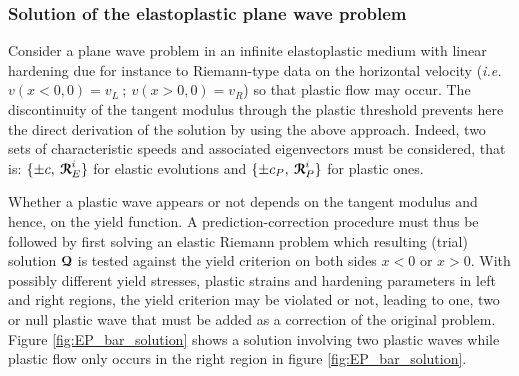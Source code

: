 \subsubsection{Solution of the elastoplastic plane wave problem}
Consider a plane wave problem in an infinite elastoplastic medium with linear hardening due for instance to Riemann-type data on the horizontal velocity (\textit{i.e. }$v(x<0,0)=v_L\:;\:v(x>0,0)=v_R$) so that plastic flow may occur.
The discontinuity of the tangent modulus through the plastic threshold prevents here the direct derivation of the solution by using the above approach. Indeed, two sets of characteristic speeds and associated eigenvectors must be considered, that is: $\{\pm c , \: {\boldsymbol{\mathcal{R}}}^i_E\}$ for elastic evolutions and $\{\pm c_P, \: {\boldsymbol{\mathcal{R}}}^i_P\}$ for plastic ones.

Whether a plastic wave appears or not depends on the tangent modulus and hence, on the yield function. A prediction-correction procedure must thus be followed by first solving an elastic Riemann problem which resulting (trial) solution ${\boldsymbol{\mathcal{Q}}}$ is tested against the yield criterion on both sides $x<0$ or $x>0$. With possibly different yield stresses, plastic strains and hardening parameters in left and right regions, the yield criterion may be violated or not, leading to one, two or null plastic wave that must be added as a correction of the original problem. Figure \ref{fig:EP_bar_solution} shows a solution involving two plastic waves while plastic flow only occurs in the right region in figure \ref{fig:EP_bar_solution}.

